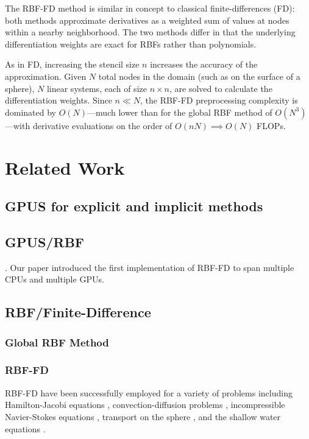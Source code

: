 \documentclass[11pt]{report}
\begin{document}
The RBF-FD method is similar in concept to classical 
finite-differences (FD): both methods approximate derivatives as a weighted sum of values at nodes within a nearby neighborhood. The two methods differ in that the underlying differentiation 
weights are exact for RBFs rather than polynomials. 

As in FD, increasing the stencil size $n$  increases the accuracy of the approximation.
Given $N$ total nodes in the domain (such as on the surface of a sphere), $N$ linear systems, each of size $n \times n$, are solved to calculate the differentiation weights. Since $n \ll N$, the RBF-FD preprocessing complexity is dominated by $O(N)$---much lower than for the global RBF method of $O(N^3)$---with derivative evaluations on the order of $O(nN) \implies O(N)$ FLOPs. 

\chapter{Related Work}

\section{  GPUS for explicit and implicit methods }



\section{  GPUS/RBF }

\cite{Schmidt2009a,Schmidt2009b}. Our paper \cite{BolligFlyerErlebacher2012} introduced the first implementation of RBF-FD to span multiple CPUs and multiple GPUs. 

\section{  RBF/Finite-Difference }

\subsection{Global RBF Method}

\subsection{RBF-FD}
RBF-FD have been successfully employed for a variety of problems including Hamilton-Jacobi equations \cite{Cecil2004}, convection-diffusion problems \cite{Chandhini2007, Stevens2009b},
incompressible Navier-Stokes equations \cite{Shu2003,Chinchapatnam2009}, transport on the sphere \cite{FornbergLehto11}, and the shallow water equations \cite{FlyerLehto11}.
\end{document}

